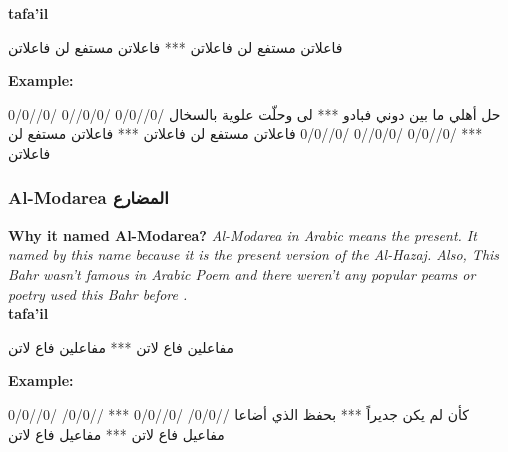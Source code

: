 \textbf{tafa'il}

\begin{Arabic}
  \begin{traditionalpoem*}

    فاعلاتن مستفع لن فاعلاتن *** فاعلاتن مستفع لن فاعلاتن
	\end{traditionalpoem*}
      \end{Arabic}


\textbf{Example:}

\begin{Arabic}
  \begin{traditionalpoem*}


    حل أهلي ما بين دوني فبادو *** لى وحلّت علوية بالسخال
    /0//0/0 /0/0//0  /0//0/0 *** /0//0/0 /0/0//0 /0//0/0
    فاعلاتن مستفع لن فاعلاتن *** فاعلاتن مستفع لن فاعلاتن


	\end{traditionalpoem*}
      \end{Arabic}



\subsubsection{Al-Modarea \textarabic{المضارع}}
\textbf{Why it named Al-Modarea?}
\textit{Al-Modarea in Arabic means the present. It named by this name because it is the present version of the Al-Hazaj. Also, This Bahr wasn't famous in Arabic Poem and there weren't any popular peams or poetry used this Bahr before \cite{Alkafi1994}. }\\

\textbf{tafa'il}

\begin{Arabic}
  \begin{traditionalpoem*}

مفاعلين فاع لاتن *** مفاعلين فاع لاتن

  \end{traditionalpoem*}
      \end{Arabic}


\textbf{Example:}

\begin{Arabic}
  \begin{traditionalpoem*}


    كأن لم يكن جديراً *** بحفظ الذي أضاعا
    //0/0/  /0//0/0 *** //0/0/  /0//0/0
    مفاعيل  فاع لاتن *** مفاعيل  فاع لاتن


	\end{traditionalpoem*}
      \end{Arabic}
 \newpage


